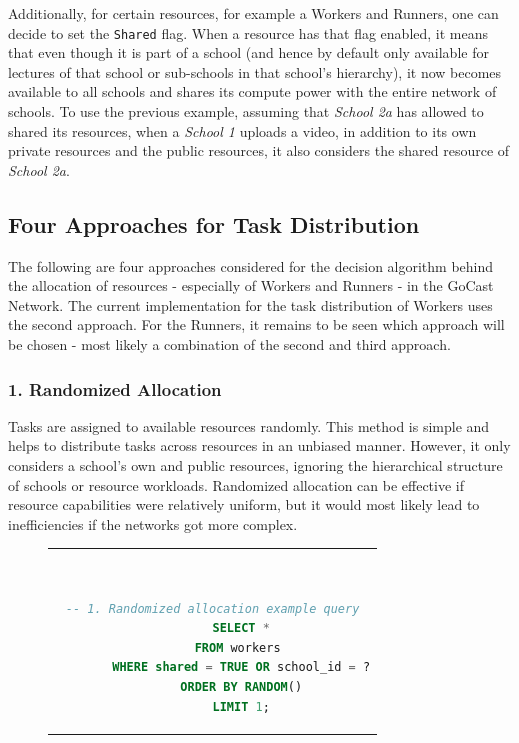 Additionally, for certain resources, for example a Workers and Runners, one can decide to set the \texttt{Shared} flag. When a resource has that flag enabled, it means that even though it is part of a school (and hence by default only available for lectures of that school or sub-schools in that school's hierarchy), it now becomes available to all schools and shares its compute power with the entire network of schools. To use the previous example, assuming that \textit{School 2a} has allowed to shared its resources, when a \textit{School 1} uploads a video, in addition to its own private resources and the public resources, it also considers the shared resource of \textit{School 2a}.

\subsection{Four Approaches for Task Distribution}

The following are four approaches considered for the decision algorithm behind the allocation of resources - especially of Workers and Runners - in the GoCast Network. The current implementation for the task distribution of Workers uses the second approach. For the Runners, it remains to be seen which approach will be chosen - most likely a combination of the second and third approach. 

\subsubsection{1. Randomized Allocation}
     Tasks are assigned to available resources randomly. This method is simple and helps to distribute tasks across resources in an unbiased manner. However, it only considers a school's own and public resources, ignoring the hierarchical structure of schools or resource workloads. Randomized allocation can be effective if resource capabilities were relatively uniform, but it would most likely lead to inefficiencies if the networks got more complex.

    \begin{figure}[htpb]
      \begin{tabular}{c}
      \ \small \begin{lstlisting}[language=SQL]
        -- 1. Randomized allocation example query
        SELECT *
        FROM workers 
        WHERE shared = TRUE OR school_id = ?
        ORDER BY RANDOM()
        LIMIT 1;
        \end{lstlisting}
      \end{tabular}
      \label{fig:randomized-allocation}
    \end{figure}
    
